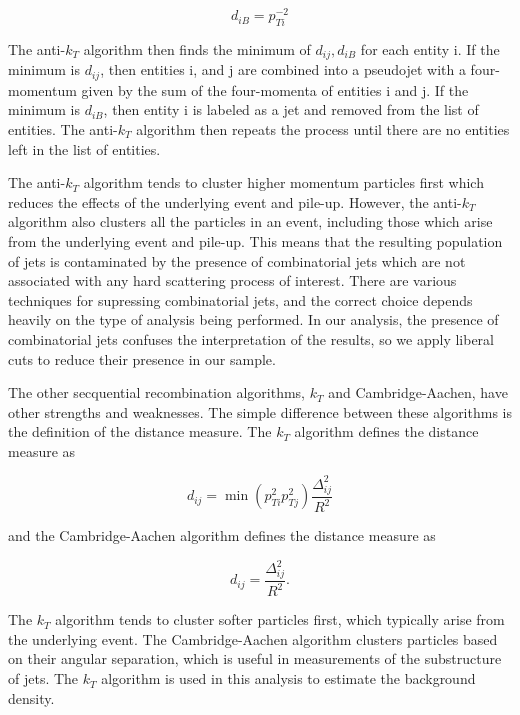\begin{equation}
d_{iB} = p_{Ti}^{-2}
\end{equation}

The anti-$k_T$ algorithm then finds the minimum of ${d_{ij}, d_{iB}}$ for each entity i. If the minimum is $d_{ij}$, then entities i, and j are combined into a pseudojet with a four-momentum given by the sum of the four-momenta of entities i and j. If the minimum is $d_{iB}$, then entity i is labeled as a jet and removed from the list of entities. The anti-$k_T$ algorithm then repeats the process until there are no entities left in the list of entities.

The anti-$k_T$ algorithm tends to cluster higher momentum particles first which reduces the effects of the underlying event and pile-up. However, the anti-$k_T$ algorithm also clusters all the particles in an event, including those which arise from the underlying event and pile-up. This means that the resulting population of jets is contaminated by the presence of combinatorial jets which are not associated with any hard scattering process of interest. There are various techniques for supressing combinatorial jets, and the correct choice depends heavily on the type of analysis being performed. In our analysis, the presence of combinatorial jets confuses the interpretation of the results, so we apply liberal cuts to reduce their presence in our sample. 

The other secquential recombination algorithms, $k_T$ and Cambridge-Aachen, have other strengths and weaknesses. The simple difference between these algorithms is the definition of the distance measure. The $k_T$ algorithm defines the distance measure as

\begin{equation}
d_{ij} = \min(p_{Ti}^{2} p_{Tj}^{2})\frac{\Delta_{ij}^2}{R^2}
\end{equation}

and the Cambridge-Aachen algorithm defines the distance measure as

\begin{equation}
d_{ij} = \frac{\Delta_{ij}^2}{R^2}.
\end{equation}

The $k_T$ algorithm tends to cluster softer particles first, which typically arise from the underlying event. The Cambridge-Aachen algorithm clusters particles based on their angular separation, which is useful in measurements of the substructure of jets. The $k_T$ algorithm is used in this analysis to estimate the background density. 

